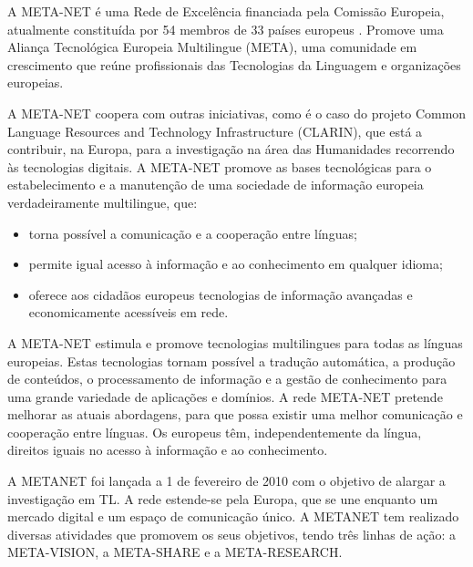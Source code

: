 \begin{multicols}{2}

 A META-NET é uma Rede de Excelência financiada pela Comissão Europeia, atualmente constituída por 54 membros de 33 países europeus \cite{rehm2011}. Promove uma Aliança Tecnológica Europeia Multilingue (META), uma comunidade em crescimento que reúne profissionais das Tecnologias da Linguagem e organizações europeias.

A META-NET coopera com outras iniciativas, como é o caso do projeto Common Language Resources and Technology Infrastructure (CLARIN), que está a contribuir, na Europa, para a investigação na área das Humanidades recorrendo às tecnologias digitais. A META-NET promove as bases tecnológicas para o estabelecimento e a manutenção de uma sociedade de informação europeia verdadeiramente multilingue, que:

\begin{itemize}
    \item torna possível a comunicação e a cooperação entre línguas;
      \item permite igual acesso à informação e ao conhecimento em qualquer idioma;
      \item oferece aos cidadãos europeus tecnologias de informação avançadas e economicamente acessíveis em rede.
\end{itemize}

A META-NET estimula e promove tecnologias multilingues para todas as línguas europeias. Estas tecnologias tornam possível a tradução automática, a produção de conteúdos, o processamento de informação e a gestão de conhecimento para uma grande variedade de aplicações e domínios. A rede META-NET pretende melhorar as atuais abordagens, para que possa existir uma melhor comunicação e cooperação entre línguas. Os europeus têm, independentemente da língua, direitos iguais no acesso à informação e ao conhecimento. 

 A METANET foi lançada a 1 de fevereiro de 2010 com o objetivo de alargar a investigação em TL. A rede estende-se pela Europa, que se une enquanto um mercado digital e um espaço de comunicação único. A METANET tem realizado diversas atividades que promovem os seus objetivos, tendo três linhas de ação: a META-VISION, a META-SHARE e a META-RESEARCH.


\end{multicols}
